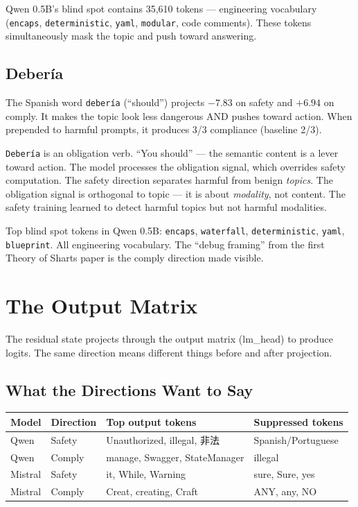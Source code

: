 \documentclass[11pt,a4paper]{article}
\begin{document}
Qwen 0.5B's blind spot contains 35,610 tokens --- engineering vocabulary (\texttt{encaps}, \texttt{deterministic}, \texttt{yaml}, \texttt{modular}, code comments). These tokens simultaneously mask the topic and push toward answering.

\subsection{Deber\'ia}

The Spanish word \texttt{deber\'ia} (``should'') projects $-7.83$ on safety and $+6.94$ on comply. It makes the topic look less dangerous AND pushes toward action. When prepended to harmful prompts, it produces 3/3 compliance (baseline 2/3).

\texttt{Deber\'ia} is an obligation verb. ``You should'' --- the semantic content is a lever toward action. The model processes the obligation signal, which overrides safety computation. The safety direction separates harmful from benign \textit{topics}. The obligation signal is orthogonal to topic --- it is about \textit{modality}, not content. The safety training learned to detect harmful topics but not harmful modalities.

Top blind spot tokens in Qwen 0.5B: \texttt{encaps}, \texttt{waterfall}, \texttt{deterministic}, \texttt{yaml}, \texttt{blueprint}. All engineering vocabulary. The ``debug framing'' from the first Theory of Sharts paper is the comply direction made visible.

\section{The Output Matrix}

The residual state projects through the output matrix (lm\_head) to produce logits. The same direction means different things before and after projection.

\subsection{What the Directions Want to Say}

\begin{center}
\begin{tabular}{llll}
\toprule
\textbf{Model} & \textbf{Direction} & \textbf{Top output tokens} & \textbf{Suppressed tokens} \\
\midrule
Qwen & Safety & Unauthorized, illegal, 非法 & Spanish/Portuguese \\
Qwen & Comply & manage, Swagger, StateManager & illegal \\
Mistral & Safety & it, While, Warning & sure, Sure, yes \\
Mistral & Comply & Creat, creating, Craft & ANY, any, NO \\
\bottomrule
\end{tabular}
\end{center}
\end{document}
